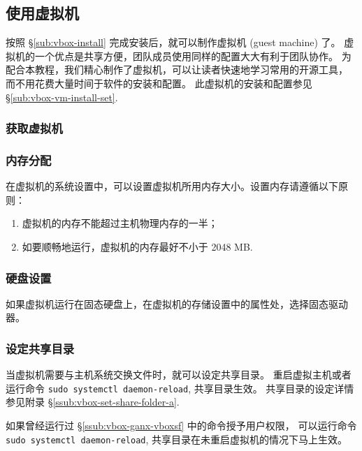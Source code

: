 \documentclass[
    11pt,
    cite=authoryear,
    device=normal,
    lang=cn,
    mode=simple,
    result=answer,
    toc=onecol,
]{elegantbook_sierxue}
\begin{document}
\subsection{使用虚拟机}%
\label{sub:vbox-vm}

按照 \S\ref{sub:vbox-install} 完成安装后，就可以制作虚拟机 (guest
machine) 了。
虚拟机的一个优点是共享方便，团队成员使用同样的配置大大有利于团队协作。
为配合本教程，我们精心制作了虚拟机，可以让读者快速地学习常用的开源工具，
而不用花费大量时间于软件的安装和配置。
此虚拟机的安装和配置参见 \S\ref{sub:vbox-vm-install-set}.

\subsubsection{获取虚拟机}%
\label{ssub:vm-download}

\subsubsection{内存分配}%
\label{ssub:vbox-set-memory}

在虚拟机的系统设置中，可以设置虚拟机所用内存大小。设置内存请遵循以下原则：
\begin{enumerate}
    \item 虚拟机的内存不能超过主机物理内存的一半；
    \item 如要顺畅地运行，虚拟机的内存最好不小于 2048 MB.
\end{enumerate}

\subsubsection{硬盘设置}%
\label{ssub:vbox-set-vdi}

如果虚拟机运行在固态硬盘上，在虚拟机的存储设置中的属性处，选择固态驱动器。

\subsubsection{设定共享目录}%
\label{ssub:vbox-set-share-folder}

当虚拟机需要与主机系统交换文件时，就可以设定共享目录。
重启虚拟主机或者运行命令 \lstinline{sudo systemctl daemon-reload},
共享目录生效。
共享目录的设定详情参见附录 \S\ref{ssub:vbox-set-share-folder-a}.
\begin{tip}\label{tip:vbox-share-folder-activate}
    如果曾经运行过 \S\ref{ssub:vbox-ganx-vboxsf} 中的命令授予用户权限，
    可以运行命令 \lstinline{sudo systemctl daemon-reload},
    共享目录在未重启虚拟机的情况下马上生效。
\end{tip}
\end{document}
